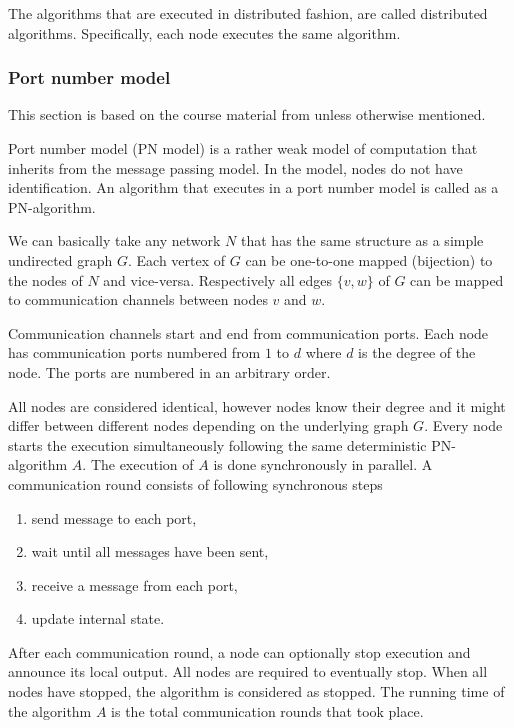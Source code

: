 The algorithms that are executed in distributed fashion, are called distributed algorithms.
Specifically, each node executes the same algorithm.



\subsubsection{Port number model} \label{sec:port_number_model}
This section is based on the course material from \cite{HirvonenSuomelaDistAlg2020} unless otherwise mentioned.

Port number model (PN model) is a rather weak model of computation that inherits from the message passing model.
In the model, nodes do not have identification.
An algorithm that executes in a port number model is called as a PN-algorithm.

We can basically take any network $N$ that has the same structure as a simple undirected graph $G$.
Each vertex of $G$ can be one-to-one mapped (bijection) to the nodes of $N$ and vice-versa.
Respectively all edges $\{v, w\}$ of $G$ can be mapped to communication channels between nodes $v$ and $w$.

Communication channels start and end from communication ports.
Each node has communication ports numbered from $1$ to $d$ where $d$ is the degree of the node.
The ports are numbered in an arbitrary order.

All nodes are considered identical, however nodes know their degree and it might differ between different nodes depending on the underlying graph $G$.
Every node starts the execution simultaneously following the same deterministic PN-algorithm $A$.
The execution of $A$ is done synchronously in parallel.
A communication round consists of following synchronous steps
\begin{enumerate}
  \item send message to each port,
  \item wait until all messages have been sent,
  \item receive a message from each port,
  \item update internal state.
\end{enumerate}
After each communication round, a node can optionally stop execution and announce its local output.
All nodes are required to eventually stop.
When all nodes have stopped, the algorithm is considered as stopped.
The running time of the algorithm $A$ is the total communication rounds that took place.









